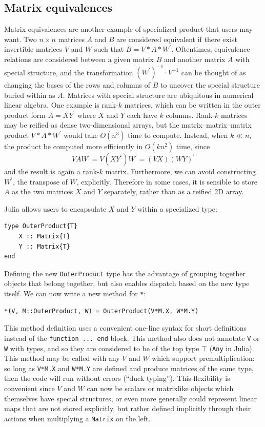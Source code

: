 \documentclass[10pt, preprint]{sigplanconf}
\begin{document}
\subsection{Matrix equivalences}

Matrix equivalences are another example of specialized product that users may
want. Two $n\times n$ matrices $A$ and $B$ are considered equivalent if there
exist invertible matrices $V$ and $W$ such that $B = V * A * W^\prime$.
Oftentimes, equivalence relations are considered between a given matrix $B$ and
another matrix $A$ with special structure, and the transformation
$(W^\prime)^{-1} \cdot V^{-1}$ can be thought of as changing the bases of the
rows and columns of $B$ to uncover the special structure buried within as $A$.
Matrices with special structure are ubiquitous in numerical linear algebra. One
example is rank-$k$ matrices, which can be written in the outer product form $A
= X Y^\prime$ where $X$ and $Y$ each have $k$ columns. Rank-$k$ matrices may be
reified as dense two-dimensional arrays, but the matrix--matrix--matrix product
$V * A * W^\prime$ would take $O(n^3)$ time to compute. Instead, when $k \ll
n$, the product be computed more efficiently in $O(kn^2)$ time, since
%
\begin{equation}
V A W^\prime = V (X Y^\prime) W^\prime = (V X) (W Y)^\prime
\end{equation}
%
and the result is again a rank-$k$ matrix. Furthermore, we can avoid
constructing $W^\prime$, the transpose of $W$, explicitly. Therefore in some
cases, it is sensible to store $A$ as the two matrices $X$ and $Y$ separately,
rather than as a reified 2D array.

Julia allows users to encapsulate $X$ and $Y$ within a specialized type:
%
\begin{lstlisting}
type OuterProduct{T}
	X :: Matrix{T}
	Y :: Matrix{T}
end
\end{lstlisting}
%
Defining the new \lstinline|OuterProduct| type has the advantage of grouping
together objects that belong together, but also enables dispatch based on the
new type itself. We can now write a new method for \lstinline|*|:
%
\begin{lstlisting}
*(V, M::OuterProduct, W) = OuterProduct(V*M.X, W*M.Y)
\end{lstlisting}
%
This method definition uses a convenient one-line syntax for short definitions
instead of the \lstinline|function ... end| block. This method also does not
annotate \lstinline|V| or \lstinline|W| with types, and so they are considered to
be of the top type $\top$ (\lstinline|Any| in Julia). This method may be called
with any $V$ and $W$ which support premultiplication: so long as
\lstinline|V*M.X| and \lstinline|W*M.Y| are defined and produce matrices of the
same type, then the code will run without errors (``duck typing'').
This flexibility is
convenient since $V$ and $W$ can now be scalars or matrixlike objects which
themselves have special structures, or even more generally could represent
linear maps that are not stored explicitly, but rather defined implicitly
through their actions when multiplying a \lstinline|Matrix| on the left.
\end{document}
